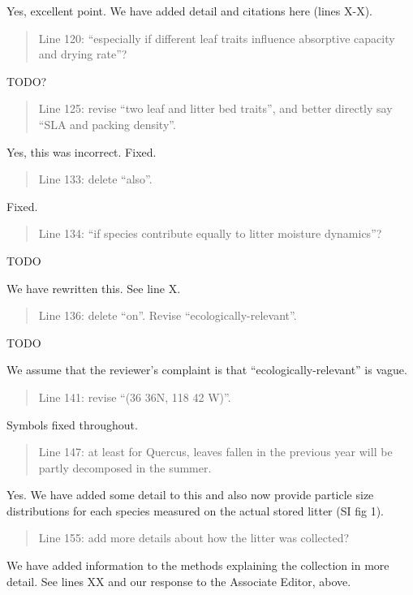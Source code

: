 \documentclass[letterpaper, 12pt]{letter}
\begin{document}
\begin{letter}{}
Yes, excellent point. We have added detail and citations here (lines X-X).

\begin{quote}
Line 120: “especially if different leaf traits influence absorptive capacity and drying rate”?
\end{quote}

TODO?

\begin{quote}
Line 125: revise “two leaf and litter bed traits”, and better directly say “SLA and packing density”.
\end{quote}

Yes, this was incorrect. Fixed.

\begin{quote}
Line 133: delete “also”.
\end{quote}

Fixed.

\begin{quote}
Line 134: “if species contribute equally to litter moisture dynamics”?
\end{quote}

TODO

We have rewritten this. See line X.

\begin{quote}
Line 136: delete “on”. Revise “ecologically-relevant”.
\end{quote}

TODO

We assume that the reviewer's complaint is that ``ecologically-relevant'' is vague.

\begin{quote}
Line 141: revise “(36 36N, 118 42 W)”.
\end{quote}

Symbols fixed throughout.

\begin{quote}
Line 147: at least for Quercus, leaves fallen in the previous year will be partly decomposed in the summer.
\end{quote}

Yes. We have added some detail to this and also now provide particle size distributions for each species measured on the actual stored litter (SI fig 1).

\begin{quote}
Line 155: add more details about how the litter was collected?
\end{quote}

We have added information to the methods explaining the collection in more detail. See lines XX and our response to the Associate Editor, above. 


\end{letter}
\end{document}

